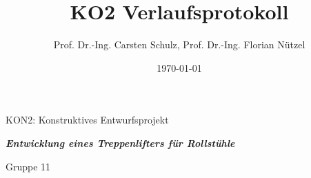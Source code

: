 \documentclass[10pt,a4paper]{article}
\author{{\LARGE Prof. Dr.-Ing. Carsten Schulz, Prof. Dr.-Ing. Florian Nützel}}
\title{\textbf{{\Huge KO2 Verlaufsprotokoll}}}
\date{{\Large \today}}
\begin{document}
\maketitle
\begin{center}

    \Large KON2: Konstruktives Entwurfsprojekt

    \vspace{1cm}

    \textbf{\textit{Entwicklung eines Treppenlifters für Rollstühle}}

    \vspace{1cm}

    {\Large Gruppe 11}
\end{center}



\end{document}
